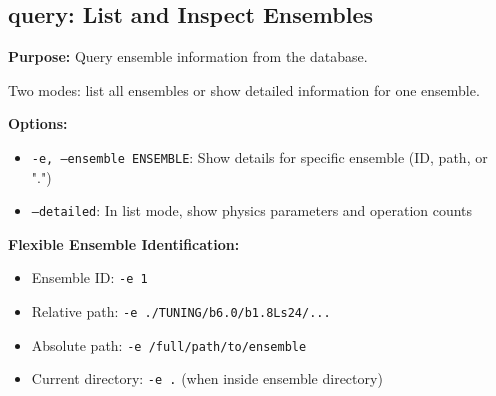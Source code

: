 \documentclass{article}
\begin{document}
\subsection{query: List and Inspect Ensembles}

\textbf{Purpose:} Query ensemble information from the database.

Two modes: list all ensembles or show detailed information for one ensemble.

\textbf{Options:}
\begin{itemize}
\item \texttt{-e, --ensemble ENSEMBLE}: Show details for specific ensemble (ID, path, or ".")
\item \texttt{--detailed}: In list mode, show physics parameters and operation counts
\end{itemize}

\textbf{Flexible Ensemble Identification:}
\begin{itemize}
\item Ensemble ID: \texttt{-e 1}
\item Relative path: \texttt{-e ./TUNING/b6.0/b1.8Ls24/...}
\item Absolute path: \texttt{-e /full/path/to/ensemble}
\item Current directory: \texttt{-e .} (when inside ensemble directory)
\end{itemize}
\end{document}
